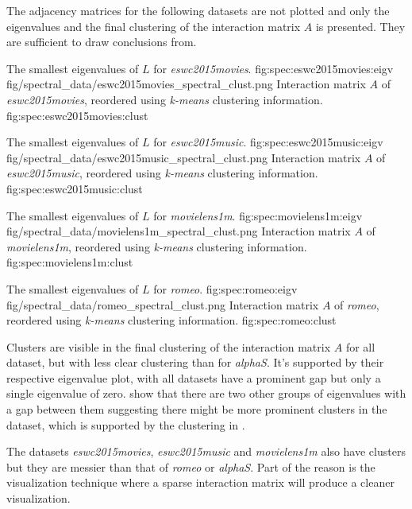 \newpage
The adjacency matrices for the following datasets are not plotted and only the eigenvalues and the final clustering of the interaction matrix $A$ is presented. They are sufficient to draw conclusions from.

\FloatBarrier

{The smallest eigenvalues of $L$ for \textit{eswc2015movies}.}
{fig:spec:eswc2015movies:eigv}
{fig/spectral_data/eswc2015movies_spectral_clust.png}
{Interaction matrix $A$ of \textit{eswc2015movies}, reordered using \textit{k-means} clustering information.}
{fig:spec:eswc2015movies:clust}

{The smallest eigenvalues of $L$ for \textit{eswc2015music}.}
{fig:spec:eswc2015music:eigv}
{fig/spectral_data/eswc2015music_spectral_clust.png}
{Interaction matrix $A$ of \textit{eswc2015music}, reordered using \textit{k-means} clustering information.}
{fig:spec:eswc2015music:clust}

{The smallest eigenvalues of $L$ for \textit{movielens1m}.}
{fig:spec:movielens1m:eigv}
{fig/spectral_data/movielens1m_spectral_clust.png}
{Interaction matrix $A$ of \textit{movielens1m}, reordered using \textit{k-means} clustering information.}
{fig:spec:movielens1m:clust}

\FloatBarrier

{The smallest eigenvalues of $L$ for \textit{romeo}.}
{fig:spec:romeo:eigv}
{fig/spectral_data/romeo_spectral_clust.png}
{Interaction matrix $A$ of \textit{romeo}, reordered using \textit{k-means} clustering information.}
{fig:spec:romeo:clust}


\newpage

Clusters are visible in the final clustering of the interaction matrix $A$ for all dataset, but with less clear clustering than for \textit{alphaS}. It's supported by their respective eigenvalue plot, with all datasets have a prominent gap but only a single eigenvalue of zero.  show that there are two other groups of eigenvalues with a gap between them suggesting there might be more prominent clusters in the dataset, which is supported by the clustering in .

The datasets \textit{eswc2015movies}, \textit{eswc2015music} and \textit{movielens1m} also have clusters but they are messier than that of \textit{romeo} or \textit{alphaS}. Part of the reason is the visualization technique where a sparse interaction matrix will produce a cleaner visualization.

